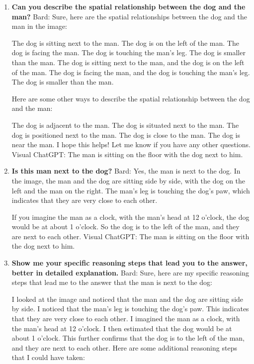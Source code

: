     \begin{enumerate}
        \item \textbf{Can you describe the spatial relationship between the dog and the man?}
        \subitem Bard: 
        Sure, here are the spatial relationships between the dog and the man in the image:
        
        The dog is sitting next to the man.
        The dog is on the left of the man.
        The dog is facing the man.
        The dog is touching the man's leg.
        The dog is smaller than the man.
        The dog is sitting next to the man, and the dog is on the left of the man. The dog is facing the man, and the dog is touching the man's leg. The dog is smaller than the man.
        
        Here are some other ways to describe the spatial relationship between the dog and the man:
        
        The dog is adjacent to the man.
        The dog is situated next to the man.
        The dog is positioned next to the man.
        The dog is close to the man.
        The dog is near the man.
        I hope this helps! Let me know if you have any other questions.
        \subitem Visual ChatGPT: The man is sitting on the floor with the dog next to him.
        \item \textbf{Is this man next to the dog?}
        \subitem Bard: Yes, the man is next to the dog. In the image, the man and the dog are sitting side by side, with the dog on the left and the man on the right. The man's leg is touching the dog's paw, which indicates that they are very close to each other.

        If you imagine the man as a clock, with the man's head at 12 o'clock, the dog would be at about 1 o'clock. So the dog is to the left of the man, and they are next to each other.
        \subitem Visual ChatGPT: The man is sitting on the floor with the dog next to him.
        \item \textbf{Show me your specific reasoning steps that lead you to the answer, better in detailed explanation.}
        \subitem Bard: 
        Sure, here are my specific reasoning steps that lead me to the answer that the man is next to the dog:
        
        I looked at the image and noticed that the man and the dog are sitting side by side.
        I noticed that the man's leg is touching the dog's paw. This indicates that they are very close to each other.
        I imagined the man as a clock, with the man's head at 12 o'clock. I then estimated that the dog would be at about 1 o'clock. This further confirms that the dog is to the left of the man, and they are next to each other.
        Here are some additional reasoning steps that I could have taken:
        

\end{enumerate}
